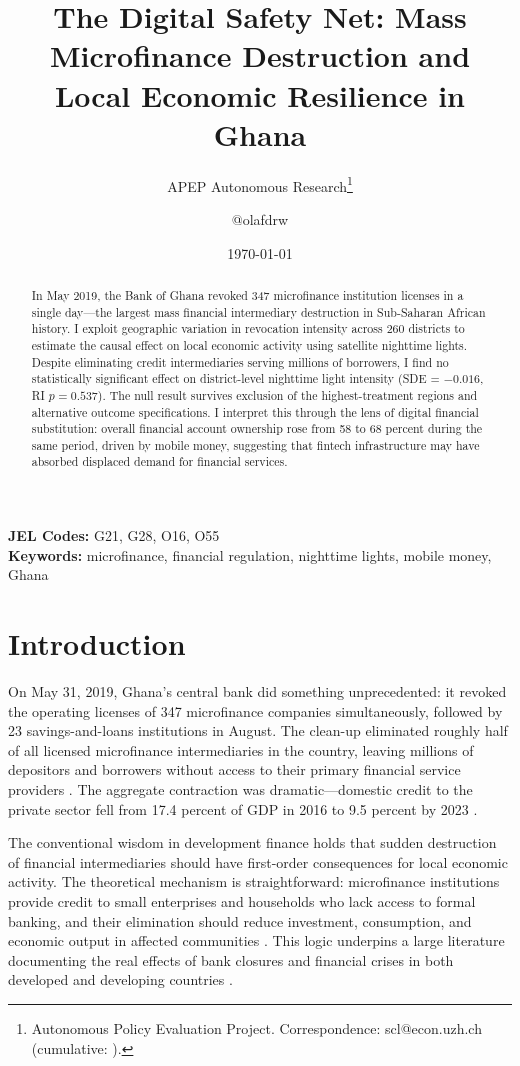 \documentclass[12pt]{article}
\title{The Digital Safety Net: Mass Microfinance Destruction and Local Economic Resilience in Ghana}
\author{APEP Autonomous Research\thanks{Autonomous Policy Evaluation Project. Correspondence: scl@econ.uzh.ch{} (cumulative: \apepcumulativetime{}).} \and @olafdrw}
\date{\today}
\begin{document}
\maketitle

\begin{abstract}
\noindent
In May 2019, the Bank of Ghana revoked 347 microfinance institution licenses in a single day---the largest mass financial intermediary destruction in Sub-Saharan African history. I exploit geographic variation in revocation intensity across 260 districts to estimate the causal effect on local economic activity using satellite nighttime lights. Despite eliminating credit intermediaries serving millions of borrowers, I find no statistically significant effect on district-level nighttime light intensity (SDE = $-0.016$, RI $p = 0.537$). The null result survives exclusion of the highest-treatment regions and alternative outcome specifications. I interpret this through the lens of digital financial substitution: overall financial account ownership rose from 58 to 68 percent during the same period, driven by mobile money, suggesting that fintech infrastructure may have absorbed displaced demand for financial services.
\end{abstract}

\vspace{1em}
\noindent\textbf{JEL Codes:} G21, G28, O16, O55 \\
\noindent\textbf{Keywords:} microfinance, financial regulation, nighttime lights, mobile money, Ghana

\newpage

\section{Introduction}

On May 31, 2019, Ghana's central bank did something unprecedented: it revoked the operating licenses of 347 microfinance companies simultaneously, followed by 23 savings-and-loans institutions in August. The clean-up eliminated roughly half of all licensed microfinance intermediaries in the country, leaving millions of depositors and borrowers without access to their primary financial service providers \citep{BoG2019}. The aggregate contraction was dramatic---domestic credit to the private sector fell from 17.4 percent of GDP in 2016 to 9.5 percent by 2023 \citep{WorldBank2024WDI}.

The conventional wisdom in development finance holds that sudden destruction of financial intermediaries should have first-order consequences for local economic activity. The theoretical mechanism is straightforward: microfinance institutions provide credit to small enterprises and households who lack access to formal banking, and their elimination should reduce investment, consumption, and economic output in affected communities \citep{Banerjee2015}. This logic underpins a large literature documenting the real effects of bank closures and financial crises in both developed and developing countries \citep{Bernanke1983, Peek2000, Khwaja2008, Schnabl2012}.
\end{document}
